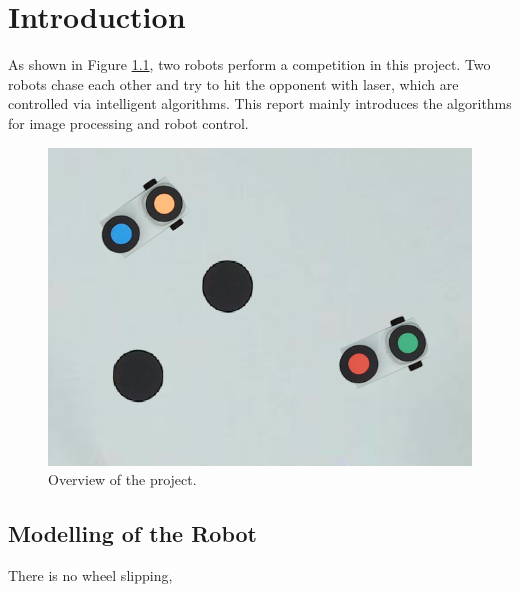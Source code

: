 \chapter{Introduction}
\renewcommand{\thepage}{\arabic{page}}
\setcounter{page}{1}

As shown in Figure \ref{intro}, two robots perform a competition in this project. Two robots chase each other and try to hit the opponent with laser, which are controlled via intelligent algorithms. This report mainly introduces the algorithms for image processing and robot control.

\begin{figure}[thb]
    \centering
    \includegraphics[width=1\textwidth]{images/intro.png}
    \caption[Overview of the project]{Overview of the project.}\label{intro}
\end{figure}

\section{Modelling of the Robot}

There is no wheel slipping, 

